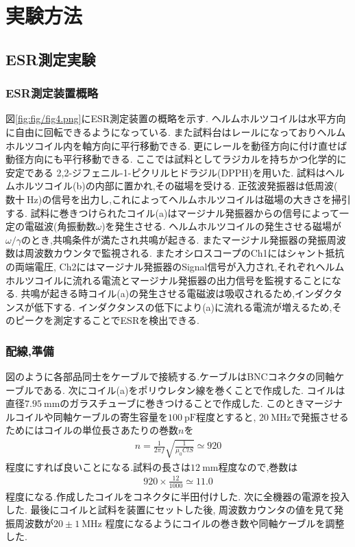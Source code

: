 \section{実験方法}
\subsection{ESR測定実験}
\subsubsection{ESR測定装置概略}
図\ref{fig:fig/fig4.png}にESR測定装置の概略を示す.
ヘルムホルツコイルは水平方向に自由に回転できるようになっている.
また試料台はレールになっておりヘルムホルツコイル内を軸方向に平行移動できる.
更にレールを動径方向に付け直せば動径方向にも平行移動できる.
ここでは試料としてラジカルを持ちかつ化学的に安定である
2,2-ジフェニル-1-ピクリルヒドラジル(DPPH)を用いた.
試料はヘルムホルツコイル(b)の内部に置かれ,その磁場を受ける.
正弦波発振器は低周波($数十\ \si{\hertz}$)の信号を出力し,これによってヘルムホルツコイルは磁場の大きさを掃引する.
試料に巻きつけられたコイル(a)はマージナル発振器からの信号によって一定の電磁波(角振動数$\omega$)を発生させる.
ヘルムホルツコイルの発生させる磁場が$\omega/\gamma$のとき,共鳴条件が満たされ共鳴が起きる.
またマージナル発振器の発振周波数は周波数カウンタで監視される.
またオシロスコープのCh1にはシャント抵抗の両端電圧,
Ch2にはマージナル発振器のSignal信号が入力され,それぞれヘルムホルツコイルに流れる電流とマージナル発振器の出力信号を監視することになる.
共鳴が起きる時コイル(a)の発生させる電磁波は吸収されるため,インダクタンスが低下する.
インダクタンスの低下により(a)に流れる電流が増えるため,そのピークを測定することでESRを検出できる.
\subsubsection{配線,準備}
図のように各部品同士をケーブルで接続する.ケーブルはBNCコネクタの同軸ケーブルである.
次にコイル(a)をポリウレタン線を巻くことで作成した.
コイルは直径$7.95\ \si{\milli\metre}$のガラスチューブに巻きつけることで作成した.
このときマージナルコイルや同軸ケーブルの寄生容量を$100\ \si{\pico\farad}$程度とすると,
$20\ \si{\mega\hertz}$で発振させるためにはコイルの単位長さあたりの巻数$n$を
\begin{align}
  n=\frac{1}{2\pi f}\sqrt{\frac{1}{\mu_0 ClS}}\simeq 920
\end{align}
程度にすれば良いことになる.試料の長さは$12\ \si{\milli\metre}$程度なので,巻数は
\begin{align}
  920\times\frac{12}{1000}\simeq 11.0
\end{align}
程度になる.作成したコイルをコネクタに半田付けした.
次に全機器の電源を投入した.
最後にコイルと試料を装置にセットした後,
周波数カウンタの値を見て発振周波数が$20\pm1\ \si{\mega\hertz}$
程度になるようにコイルの巻き数や同軸ケーブルを調整した.
